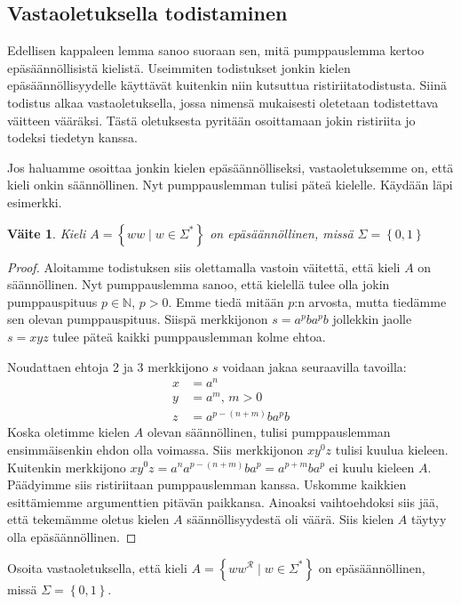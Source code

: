 \documentclass[a4paper,11pt]{article}
\newtheorem*{claim}{Väite}
\theoremstyle{definition}
\newcommand{\set}[1]{{\left\{ #1 \right\}}}
\newcommand{\Nat}{\mathbb{N}}
\begin{document}
\subsection*{Vastaoletuksella todistaminen}

Edellisen kappaleen lemma sanoo suoraan sen, mitä pumppauslemma kertoo
epäsäännöllisistä kielistä. Useimmiten todistukset jonkin kielen
epäsäännöllisyydelle käyttävät kuitenkin niin kutsuttua ristiriitatodistusta.
Siinä todistus alkaa vastaoletuksella, jossa nimensä mukaisesti oletetaan
todistettava väitteen vääräksi. Tästä oletuksesta pyritään osoittamaan
jokin ristiriita jo todeksi tiedetyn kanssa.

Jos haluamme osoittaa jonkin kielen epäsäännölliseksi, vastaoletuksemme on,
että kieli onkin säännöllinen. Nyt pumppauslemman tulisi päteä kielelle.
Käydään läpi esimerkki.

\begin{claim}
    Kieli $A = \set{ww \mid w \in \Sigma^*}$ on epäsäännöllinen, missä $\Sigma
    = \set{0,1}$
\end{claim}
\begin{proof}
    Aloitamme todistuksen siis olettamalla vastoin väitettä, että kieli $A$ on
    säännöllinen. Nyt pumppauslemma sanoo, että kielellä tulee olla jokin
    pumppauspituus $p \in \Nat$, $p > 0$. Emme tiedä mitään $p$:n arvosta,
    mutta tiedämme sen olevan pumppauspituus. Siispä merkkijonon $s =
    a^pba^pb$ jollekkin jaolle $s = xyz$ tulee päteä kaikki pumppauslemman
    kolme ehtoa.

    Noudattaen ehtoja 2 ja 3 merkkijono $s$ voidaan jakaa seuraavilla tavoilla:
    \begin{align*}
        x & = a^n \\
        y & = a^m \text{, } m > 0 \\
        z & = a^{p-(n+m)}ba^pb
    \end{align*}
    Koska oletimme kielen $A$ olevan säännöllinen, tulisi pumppauslemman
    ensimmäisenkin ehdon olla voimassa. Siis merkkijonon $xy^0z$ tulisi kuulua
    kieleen. Kuitenkin merkkijono $xy^0z = a^na^{p-(n+m)}ba^p = a^{p+m}ba^p$ ei
    kuulu kieleen $A$. Päädyimme siis ristiriitaan pumppauslemman kanssa.
    Uskomme kaikkien esittämiemme argumenttien pitävän paikkansa.
    Ainoaksi vaihtoehdoksi siis jää, että tekemämme oletus kielen $A$
    säännöllisyydestä oli väärä. Siis kielen $A$ täytyy olla epäsäännöllinen.
\end{proof}

\begin{exercise}
    Osoita vastaoletuksella, että kieli $A = \set{ww^{\mathcal{R}} \mid w \in
        \Sigma^*}$ on epäsäännöllinen, missä $\Sigma = \set{0,1}$.
\end{exercise}
\end{document}
